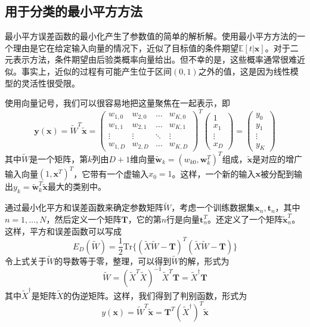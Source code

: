 \subsection*{用于分类的最小平方方法}
最小平方误差函数的最小化产生了参数值的简单的解析解。使用最小平方方法的一个理由是它在给定输入向量的情况下，近似了目标值的条件期望$\mathbb{E}[t|\boldsymbol{x}]$。对于二元表示方法，条件期望由后验类概率向量给出。但不幸的是，这些概率通常很难近似。事实上，近似的过程有可能产生位于区间$(0,1)$之外的值，这是因为线性模型的灵活性很受限。

使用向量记号，我们可以很容易地把这量聚焦在一起表示，即
\begin{equation}
	\boldsymbol{y}(\boldsymbol{x})=\tilde{W}^T\tilde{\boldsymbol{x}}
	=
	\begin{pmatrix}
	w_{1,0}& w_{2,0}& \dots& w_{K,0}\\
	w_{1,1}& w_{2,1}& \dots& w_{K,1}\\
	\vdots& \vdots & \ddots& \vdots\\
	w_{1,D}& w_{2,D}& \dots& w_{K,D}
	\end{pmatrix}^T
	\begin{pmatrix}
	1\\x_1\\\vdots\\x_{D}
	\end{pmatrix}
	=
	\begin{pmatrix}
	y_0\\y_1\\\vdots \\y_{K}
	\end{pmatrix}
\end{equation}
其中$\tilde{W}$是一个矩阵，第$k$列由$D+1$维向量$\tilde{\boldsymbol{w}}_k=(w_{k0},\boldsymbol{w}_k^T)^T$组成，$\tilde{\boldsymbol{x}}$是对应的增广输入向量$(1,\boldsymbol{x}^T)^T$，它带有一个虚输入$x_0=1$。这样，一个新的输入$\boldsymbol{x}$被分配到输出$y_k=\tilde{\boldsymbol{w}}_k^T\tilde{\boldsymbol{x}}$最大的类别中。

通过最小化平方和误差函数来确定参数矩阵$\tilde{W}$，考虑一个训练数据集$\boldsymbol{x}_n,\boldsymbol{t}_n$，其中$n=1,\dots,N$，然后定义一个矩阵$\boldsymbol{T}$，它的第$n$行是向量$\boldsymbol{t}_n^T$。还定义了一个矩阵$\tilde{\boldsymbol{x}}_n^T$。这样，平方和误差函数可以写成
\begin{equation}
	E_D(\tilde{W})=\frac{1}{2}\mathrm{Tr}\{(\tilde{X}\tilde{W}-\boldsymbol{T})^T(\tilde{X}\tilde{W}-\boldsymbol{T}) \}
\end{equation}
令上式关于$\tilde{W}$的导数等于零，整理，可以得到$\tilde{W}$的解，形式为
\begin{equation}
	\tilde{W}=(\tilde{X}^T\tilde{X})^{-1}\tilde{X}^T\boldsymbol{T}=\tilde{X}^{\dag}\boldsymbol{T}
\end{equation}
其中$\tilde{X}^\dagger$是矩阵$\tilde{X}$的伪逆矩阵。这样，我们得到了判别函数，形式为
\begin{equation}
	y(\boldsymbol{x})=\tilde{W}^T\tilde{\boldsymbol{x}}=\boldsymbol{T}^T(\tilde{X}^{\dag})^T\tilde{\boldsymbol{x}}
\end{equation}

